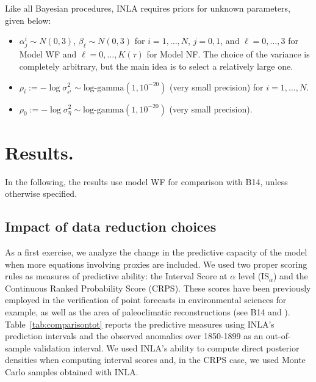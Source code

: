\documentclass[12pt]{amsart}
\theoremstyle{plain}
\theoremstyle{definition}
\theoremstyle{remark}
\newcommand{\lb}[1]{\color{MidnightBlue}\textbf{[LB: #1]}\normalcolor}
\newcommand{\jeg}[1]{\color{ProcessBlue}\textbf{[JEG: #1]}\normalcolor}
\begin{document}
Like all Bayesian procedures, INLA requires priors for unknown parameters, given below:
\begin{itemize}
\item $\alpha^i_j\sim N(0,3)$, $\beta_\ell \sim N(0,3)$ for $i=1,\ldots,N$, $j=0,1$, and  $\ell=0,\ldots,3$
  for Model WF and $\ell=0,\ldots,K(\tau)$ for Model NF. The choice of the variance is
  completely arbitrary, but the main idea is to select a relatively large one.
  
\item $\rho_i := -\log \sigma^2_{\epsilon^i}\sim \text{log-gamma}(1,10^{-20})$
  (very small precision) for $i=1,\ldots,N$.
  
\item $\rho_0 := -\log \sigma^2_\eta \sim \text{log-gamma}(1,10^{-20})$ (very
  small precision).
\end{itemize}


\section{Results.}
\label{sec:results}

In the following, the results use model WF for comparison with B14, unless otherwise specified.


\subsection{Impact of data reduction choices}
As a first exercise, we analyze the change in the predictive capacity of the
 model when more equations involving proxies are included. We used
two proper scoring rules \cite{Gneiting2007a} as measures of predictive ability: the Interval Score at $\alpha$ level
(IS$_\alpha$) and the Continuous Ranked
Probability Score (CRPS). These scores have been previously employed in the
verification of point forecasts in environmental sciences for example, as well as the area
of paleoclimatic reconstructions (see B14 and
\cite{Scheuerer2014}). Table~\ref{tab:comparisontot} reports the predictive
measures using INLA's prediction intervals and the observed
  anomalies over 1850-1899 as an out-of-sample validation interval. We used INLA's ability to compute direct
posterior densities when computing interval scores and, in the CRPS case, we used Monte Carlo samples obtained with INLA. 
\end{document}
